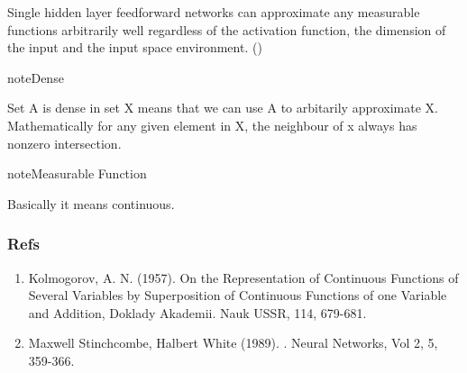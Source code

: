 \documentclass[letterpaper,12pt,english]{sphinxmanual}
\begin{document}
\sphinxquotedblleft{}Single hidden layer feedforward networks can approximate any measurable functions arbitrarily well regardless of the activation function, the dimension of the input and the input space environment.\sphinxquotedblright{}
()

\begin{sphinxadmonition}{note}{Dense}

Set A is dense in set X means that we can use A to arbitarily approximate X. Mathematically for any given element in X, the neighbour of x always has nonzero intersection.
\end{sphinxadmonition}

\begin{sphinxadmonition}{note}{Measurable Function}

Basically it means continuous.
\end{sphinxadmonition}


\subsubsection{Refs}
\label{\detokenize{artificial-neural-network/ann:refs}}\begin{enumerate}
\item {} 
Kolmogorov, A. N. (1957). \sphinxquotedblleft{}On the Representation of Continuous Functions of Several Variables by Superposition of Continuous Functions of one Variable and Addition,\sphinxquotedblright{} Doklady Akademii. Nauk USSR, 114, 679-681.

\item {} 
Maxwell Stinchcombe, Halbert White (1989).  . Neural Networks, Vol 2, 5, 359-366.

\end{enumerate}
\end{document}
